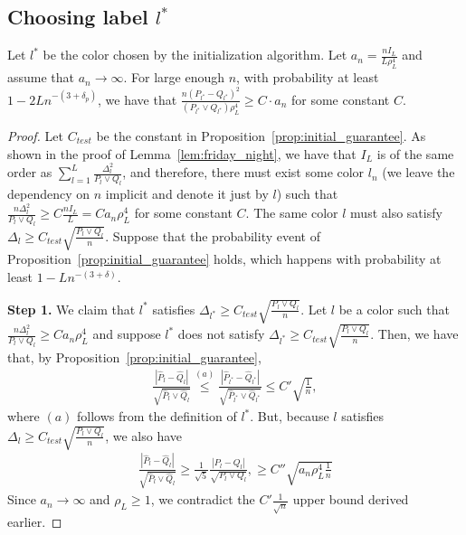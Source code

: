 \documentclass{article}
\begin{document}
\subsection{Choosing label $l^*$}
\label{appendix: starry night}

\begin{proposition}
\label{prop:initialization_correctness}
Let $l^*$ be the color chosen by the initialization algorithm. Let $a_n = \frac{ n I_L}{L \rho^4_L} $  and assume that $a_n \rightarrow \infty$. For large enough $n$, with probability at least $1 - 2L n^{-(3+\delta_p)}$, we have that $\frac{n (P_{l^*}-Q_{l^*})^2}{(P_{l^*} \vee Q_{l^*}) \rho^4_L} \ge C \cdot a_n$ for some constant $C$. 
\end{proposition}

\begin{proof}
Let $C_{test}$ be the constant in Proposition~\ref{prop:initial_guarantee}. As shown in the proof of  Lemma~\ref{lem:friday_night}, we have that  $I_L$ is of the same order as $\sum_{l=1}^L \frac{\Delta_l^2}{P_l \vee Q_l}$, and therefore, there must exist some color $l_n$ (we leave the dependency on $n$ implicit and denote it just by $l$) such that $\frac{n \Delta_l^2}{P_l \vee Q_l} \geq  C \frac{n I_L}{L} = C a_n \rho^4_L$ for some constant $C$. The same color $l$ must also satisfy $\Delta_l \geq C_{test} \sqrt{\frac{P_l \vee Q_l}{n}}$. Suppose that the probability event of Proposition~\ref{prop:initial_guarantee} holds, which happens with probability at least $1 - L n^{-(3+\delta)}$. 

\textbf{Step 1.} We claim that $l^*$ satisfies $\Delta_{l^*} \geq C_{test} \sqrt{ \frac{P_l \vee Q_l}{n}} $. Let $l$ be a color such that $\frac{n \Delta_l^2}{P_l \vee Q_l} \geq C a_n \rho^4_L$ and suppose $l^*$ does not satisfy $\Delta_{l^*} \geq C_{test} \sqrt{ \frac{P_l \vee Q_l}{n} }$. Then, we have that, by Proposition~\ref{prop:initial_guarantee}, 
\begin{align*}
\frac{| \hat{P}_l - \hat{Q}_l | }{\sqrt{ \hat{P}_l \vee \hat{Q}_l}} 
\stackrel{(a)}  \leq \frac{| \hat{P}_{l^*} - \hat{Q}_{l^*} | }{\sqrt{ \hat{P}_{l^*} \vee \hat{Q}_{l^*}}} 
         \leq C' \sqrt{ \frac{1}{n}},
\end{align*}
where $(a)$ follows from the definition of $l^*$.
But, because $l$ satisfies $\Delta_l \geq C_{test} \sqrt{ \frac{P_l \vee Q_l}{n}}$, we also have
\begin{align*}
\frac{| \hat{P}_l - \hat{Q}_l | }{\sqrt{ \hat{P}_l \vee \hat{Q}_l}} 
  \geq \frac{1}{\sqrt{5}} \frac{ | P_l - Q_l|}{\sqrt{P_l \vee Q_l}}, 
   \geq C'' \sqrt{ a_n \rho^4_L \frac{1}{n}}
\end{align*}
Since $a_n \rightarrow \infty$ and $\rho_L \geq 1$, we contradict the $C'\frac{1}{\sqrt n}$ upper bound derived earlier.


\end{proof}
\end{document}
